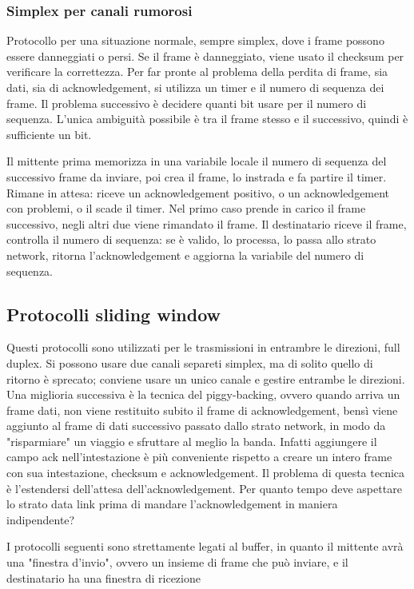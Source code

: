 \subsubsection{Simplex per canali rumorosi}
Protocollo per una situazione normale, sempre simplex, dove i frame possono essere danneggiati o persi.
Se il frame è danneggiato, viene usato il checksum per verificare la correttezza.
Per far pronte al problema della perdita di frame, sia dati, sia di acknowledgement, si utilizza un timer e il numero di sequenza dei frame.
Il problema successivo è decidere quanti bit usare per il numero di sequenza.
L'unica ambiguità possibile è tra il frame stesso e il successivo, quindi è sufficiente un bit.

Il mittente prima memorizza in una variabile locale il numero di sequenza del successivo frame da inviare, poi crea il frame, lo instrada e fa partire il timer.
Rimane in attesa: riceve un acknowledgement positivo, o un acknowledgement con problemi, o il scade il timer.
Nel primo caso prende in carico il frame successivo, negli altri due viene rimandato il frame.
Il destinatario riceve il frame, controlla il numero di sequenza: 
se è valido, lo processa, lo passa allo strato network, ritorna l'acknowledgement e aggiorna la variabile del numero di sequenza.

\subsection{Protocolli sliding window} %
Questi protocolli sono utilizzati per le trasmissioni in entrambre le direzioni, full duplex.
Si possono usare due canali separeti simplex, ma di solito quello di ritorno è sprecato; conviene usare un unico canale e gestire entrambe le direzioni.
Una miglioria successiva è la tecnica del piggy-backing, ovvero quando arriva un frame dati, non viene restituito subito il frame di acknowledgement, 
bensì viene aggiunto al frame di dati successivo passato dallo strato network, in modo da "risparmiare" un viaggio e sfruttare al meglio la banda.
Infatti aggiungere il campo ack nell'intestazione è più conveniente rispetto a creare un intero frame con sua intestazione, checksum e acknowledgement.
Il problema di questa tecnica è l'estendersi dell'attesa dell'acknowledgement.
Per quanto tempo deve aspettare lo strato data link prima di mandare l'acknowledgement in maniera indipendente?

I protocolli seguenti sono strettamente legati al buffer, in quanto il mittente avrà una "finestra d'invio", ovvero un insieme di frame che può inviare,
e il destinatario ha una finestra di ricezione 

